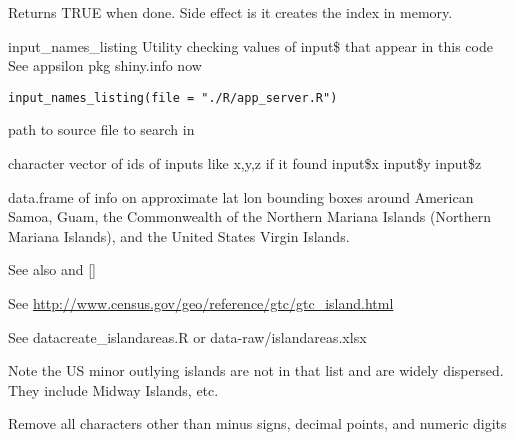 \documentclass[a4paper]{book}
\begin{document}
%
\begin{Value}
Returns TRUE when done. Side effect is it creates the index in memory.
\end{Value}
%
\begin{Description}\relax
input\_names\_listing
Utility checking values of input\$ that appear in this code
See appsilon pkg shiny.info now
\end{Description}
%
\begin{Usage}
\begin{verbatim}
input_names_listing(file = "./R/app_server.R")
\end{verbatim}
\end{Usage}
%
\begin{Arguments}
\begin{ldescription}
\item[\code{file}] path to source file to search in
\end{ldescription}
\end{Arguments}
%
\begin{Value}
character vector of ids of inputs like x,y,z if it found input\$x input\$y input\$z
\end{Value}
%
\begin{Description}\relax
data.frame of info on approximate lat lon bounding boxes around
American Samoa, Guam, the
Commonwealth of the Northern Mariana Islands (Northern Mariana Islands),
and the United States Virgin Islands.

See also  and []

See \url{http://www.census.gov/geo/reference/gtc/gtc_island.html}

See datacreate\_islandareas.R or data-raw/islandareas.xlsx

Note the US minor outlying islands are not in that list and are widely dispersed.
They include Midway Islands, etc.
\end{Description}
%
\begin{Description}\relax
Remove all characters other than minus signs, decimal points, and numeric digits
\end{Description}
\end{document}
